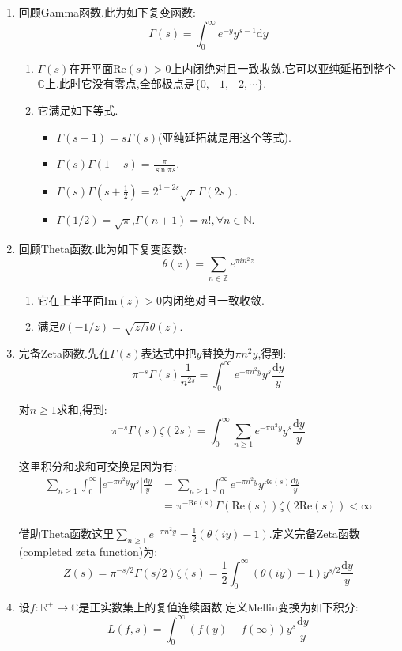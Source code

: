 \begin{enumerate}
\begin{proof}
		按照如下放缩就得到$E(s)=\zeta(s)$:
		$$\left|\prod_{p\le N}\frac{1}{1-p^{-s}}-\zeta(s)\right|\le\left|\sum_{n>N,p_i\not\mid n}\frac{1}{n^s}\right|\le\sum_{n>N}\frac{1}{n^{1+\delta}}$$
	\end{proof}
	\item 回顾Gamma函数.此为如下复变函数:
	$$\Gamma(s)=\int_0^{\infty}e^{-y}y^{s-1}\mathrm{d}y$$
	\begin{enumerate}[(1)]
		\item $\Gamma(s)$在开平面$\mathrm{Re}(s)>0$上内闭绝对且一致收敛.它可以亚纯延拓到整个$\mathbb{C}$上.此时它没有零点,全部极点是$\{0,-1,-2,\cdots\}$.
		\item 它满足如下等式.
		\begin{itemize}
			\item $\Gamma(s+1)=s\Gamma(s)$(亚纯延拓就是用这个等式).
			\item $\Gamma(s)\Gamma(1-s)=\frac{\pi}{\sin\pi s}$.
			\item $\Gamma(s)\Gamma(s+\frac{1}{2})=2^{1-2s}\sqrt{\pi}\Gamma(2s)$.
			\item $\Gamma(1/2)=\sqrt{\pi}$,$\Gamma(n+1)=n!,\forall n\in\mathbb{N}$.
		\end{itemize}
	\end{enumerate}
    \item 回顾Theta函数.此为如下复变函数:
    $$\theta(z)=\sum_{n\in\mathbb{Z}}e^{\pi in^2z}$$
    \begin{enumerate}[(1)]
    	\item 它在上半平面$\mathrm{Im}(z)>0$内闭绝对且一致收敛.
    	\item 满足$\theta(-1/z)=\sqrt{z/i}\theta(z)$.
    \end{enumerate}
	\item 完备Zeta函数.先在$\Gamma(s)$表达式中把$y$替换为$\pi n^2y$,得到:
	$$\pi^{-s}\Gamma(s)\frac{1}{n^{2s}}=\int_0^{\infty}e^{-\pi n^2y}y^s\frac{\mathrm{d}y}{y}$$
	
	对$n\ge1$求和,得到:
	$$\pi^{-s}\Gamma(s)\zeta(2s)=\int_0^{\infty}\sum_{n\ge1}e^{-\pi n^2y}y^s\frac{\mathrm{d}y}{y}$$
	
	这里积分和求和可交换是因为有:
	\begin{align*}
		\sum_{n\ge1}\int_0^{\infty}|e^{-\pi n^2y}y^s|\frac{\mathrm{d}y}{y}&=\sum_{n\ge1}\int_0^{\infty}e^{-\pi n^2y}y^{\mathrm{Re}(s)}\frac{\mathrm{d}y}{y}\\&=\pi^{-\mathrm{Re}(s)}\Gamma(\mathrm{Re}(s))\zeta(2\mathrm{Re}(s))<\infty
	\end{align*}

    借助Theta函数这里$\sum_{n\ge1}e^{-\pi n^2y}=\frac{1}{2}(\theta(iy)-1)$.定义完备Zeta函数(completed zeta function)为:
    $$Z(s)=\pi^{-s/2}\Gamma(s/2)\zeta(s)=\frac{1}{2}\int_0^{\infty}\left(\theta(iy)-1\right)y^{s/2}\frac{\mathrm{d}y}{y}$$
    \item 设$f:\mathbb{R}^+\to\mathbb{C}$是正实数集上的复值连续函数.定义Mellin变换为如下积分:
    $$L(f,s)=\int_0^{\infty}\left(f(y)-f(\infty)\right)y^s\frac{\mathrm{d}y}{y}$$
    

\end{enumerate}
